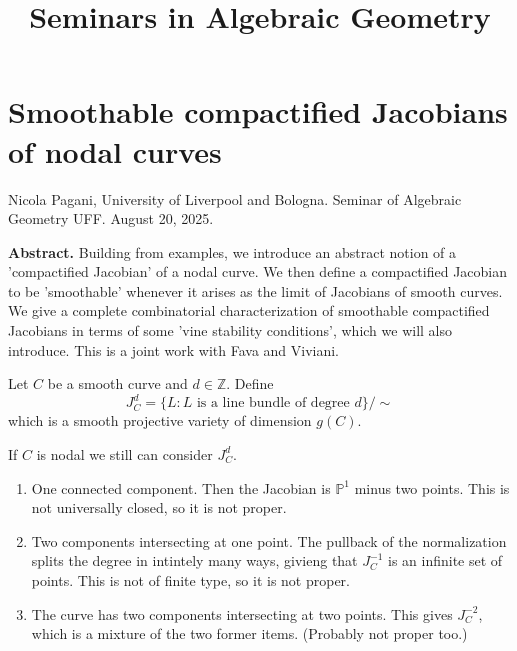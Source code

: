 



\title{Seminars in Algebraic Geometry}

\maketitle


\label{section-phantom}

\tableofcontents



\section{Smoothable compactified Jacobians of
nodal curves}
\label{section-smoot-compa-jacob-nodal}

\noindent
Nicola Pagani, University of Liverpool and
Bologna.
Seminar of Algebraic Geometry UFF.
August 20, 2025.

\medskip\noindent
{\bf Abstract.} Building from examples, we
introduce an abstract notion of a
'compactified Jacobian' of a nodal curve. We
then define a compactified Jacobian
to be 'smoothable' whenever it arises as the
limit of Jacobians of smooth
curves. We give a complete combinatorial
characterization of smoothable
compactified Jacobians in terms of some 'vine
stability conditions', which we
will also introduce. This is a joint work
with Fava and Viviani.

\medskip\noindent



Let $C$ be a smooth curve and $d \in
\mathbb{Z}$. Define
$$
J^d_C=\{L:\text{$L$ is a line bundle of
degree $d$}\}/\sim
$$
which is a smooth projective variety of
dimension $g(C)$.

If $C$ is nodal we still can consider
$J^d_C$.
\begin{enumerate}
\item One connected component. Then the
Jacobian is $\mathbb{P}^1$ minus two
points. This is not universally closed, so it
is not proper.
\item Two components intersecting at one
point.
The pullback of the normalization splits the
degree in
intintely many ways, givieng that $J^{-1}_C$
is an infinite set of points. This
is not of finite type, so it is not proper.
\item The curve has two components
intersecting at two points.
This gives $J^{-2}_C$,
 which is a mixture of the two former items.
 (Probably not proper too.)
\end{enumerate}

